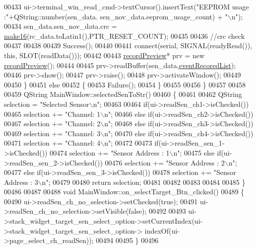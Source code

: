 \begin{DoxyCode}
00433       ui->terminal\_win\_read\_cmd->textCursor().insertText(\textcolor{stringliteral}{"EEPROM usage  :"}+QString::number(sen\_data.
      sen\_nov\_data.eeprom\_usage\_count) + \textcolor{stringliteral}{"\(\backslash\)n"});
00434       sen\_data.sen\_nov\_data.crc = \hyperlink{a00006_afcb06d9f3a6a555df9355af1dfbb4e21}{make16}(rc\_data.toLatin1(),PTR\_RESET\_COUNT);
00435 
00436       \textcolor{comment}{//crc check}
00437 
00438 
00439         Success();
00440 
00441         connect(serial, SIGNAL(readyRead()), \textcolor{keyword}{this}, SLOT(readData()));
00442 
00443         \hyperlink{a00020}{recordPreview}* prv = \textcolor{keyword}{new} \hyperlink{a00020}{recordPreview}();
00444 
00445         prv->readBuffer(sen\_data,\hyperlink{a00006_a773de5ed6b1b522f94b0347ef556137d}{eventRecoredList});
00446         prv->show();
00447         prv->raise();
00448         prv->activateWindow();
00449 
00450     \}
00451     \textcolor{keywordflow}{else}
00452     \{
00453        Failure();
00454     \}
00455 
00456 \}
00457 
00458 
00459 QString MainWindow::selectedSenToStr()
00460 \{
00461 
00462         QString selection = \textcolor{stringliteral}{"Selected Sensor\(\backslash\)n"};
00463 
00464         \textcolor{keywordflow}{if}(ui->readSen\_ch1->isChecked())
00465             selection += \textcolor{stringliteral}{"Channel: 1\(\backslash\)n"};
00466         \textcolor{keywordflow}{else} \textcolor{keywordflow}{if}(ui->readSen\_ch2->isChecked())
00467             selection += \textcolor{stringliteral}{"Channel: 2\(\backslash\)n"};
00468         \textcolor{keywordflow}{else} \textcolor{keywordflow}{if}(ui->readSen\_ch3->isChecked())
00469             selection += \textcolor{stringliteral}{"Channel: 3\(\backslash\)n"};
00470         \textcolor{keywordflow}{else} \textcolor{keywordflow}{if}(ui->readSen\_ch4->isChecked())
00471             selection += \textcolor{stringliteral}{"Channel: 4\(\backslash\)n"};
00472 
00473         \textcolor{keywordflow}{if}(ui->readSen\_sen\_1->isChecked())
00474         selection += \textcolor{stringliteral}{"Sensor Address : 1\(\backslash\)n"};
00475         \textcolor{keywordflow}{else} \textcolor{keywordflow}{if}(ui->readSen\_sen\_2->isChecked())
00476         selection += \textcolor{stringliteral}{"Sensor Address : 2\(\backslash\)n"};
00477         \textcolor{keywordflow}{else} \textcolor{keywordflow}{if}(ui->readSen\_sen\_3->isChecked())
00478         selection += \textcolor{stringliteral}{"Sensor Address : 3\(\backslash\)n"};
00479 
00480         \textcolor{keywordflow}{return} selection;
00481 
00482 
00483 
00484 
00485 \}
00486 
00487 
00488 \textcolor{keywordtype}{void} MainWindow::on\_selectTarget\_Btn\_clicked()
00489 \{
00490     ui->readSen\_ch\_no\_selection->setChecked(\textcolor{keyword}{true});
00491     ui->readSen\_ch\_no\_selection->setVisible(\textcolor{keyword}{false});
00492 
00493     ui->stack\_widget\_target\_sen\_select\_option->setCurrentIndex(ui->stack\_widget\_target\_sen\_select\_option->
      indexOf(ui->page\_select\_ch\_readSen));
00494 
00495 \}
00496 
\end{DoxyCode}
